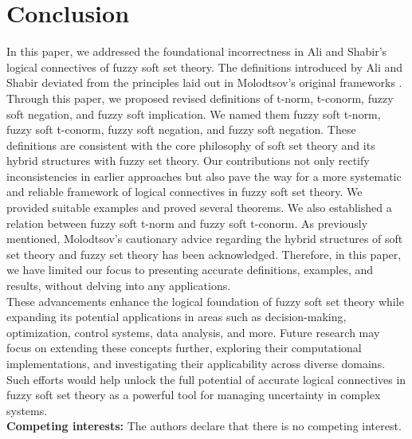 \documentclass{article}
\theoremstyle{definition}
\begin{document}
\section{Conclusion}

In this paper, we addressed the foundational incorrectness in Ali and Shabir's \cite{6} logical connectives of fuzzy soft set theory. The definitions introduced by Ali and Shabir \cite{6} deviated from the principles laid out in Molodtsov's original frameworks \cite{1,2,3,4,10,12}. Through this paper, we proposed revised definitions of t-norm, t-conorm, fuzzy soft negation, and fuzzy soft implication. We named them fuzzy soft t-norm, fuzzy soft t-conorm, fuzzy soft negation, and fuzzy soft negation. These definitions are consistent with the core philosophy of soft set theory and its hybrid structures with fuzzy set theory. Our contributions not only rectify inconsistencies in earlier approaches but also pave the way for a more systematic and reliable framework of logical connectives in fuzzy soft set theory. We provided suitable examples and proved several theorems. We also established a relation between fuzzy soft t-norm and fuzzy soft t-conorm. As previously mentioned, Molodtsov's cautionary advice regarding the hybrid structures of soft set theory and fuzzy set theory has been acknowledged. Therefore, in this paper, we have limited our focus to presenting accurate definitions, examples, and results, without delving into any applications.\\

\noindent
These advancements enhance the logical foundation of fuzzy soft set theory while expanding its potential applications in areas such as decision-making, optimization, control systems, data analysis, and more. Future research may focus on extending these concepts further, exploring their computational implementations, and investigating their applicability across diverse domains. Such efforts would help unlock the full potential of accurate logical connectives in fuzzy soft set theory as a powerful tool for managing uncertainty in complex systems.\\


{\bf Competing interests:} The authors declare that there is no competing interest.\\
\end{document}
